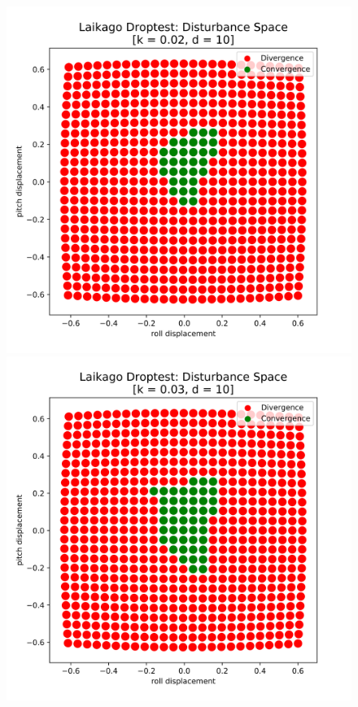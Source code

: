     \begin{figure}[h]\label{fig:}
        \centering
        \begin{minipage}{0.33\textwidth}
            \centering
            \includegraphics[width=\textwidth]{figures/droptest_ds_bad_v4.png} %
        \end{minipage}\hfill
        \begin{minipage}{0.33\textwidth}
            \centering
            \includegraphics[width=\textwidth]{figures/droptest_ds_medium_v4.png} %

\end{minipage}
\end{figure}
